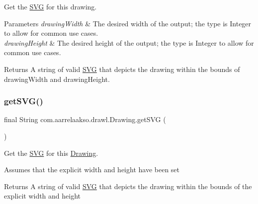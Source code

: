 Get the \hyperlink{classcom_1_1aarrelaakso_1_1drawl_1_1_s_v_g}{S\+VG} for this drawing. 


\begin{DoxyParams}{Parameters}
{\em drawing\+Width} & The desired width of the output; the type is Integer to allow for common use cases. \\
\hline
{\em drawing\+Height} & The desired height of the output; the type is Integer to allow for common use cases. \\
\hline
\end{DoxyParams}
\begin{DoxyReturn}{Returns}
A string of valid \hyperlink{classcom_1_1aarrelaakso_1_1drawl_1_1_s_v_g}{S\+VG} that depicts the drawing within the bounds of drawing\+Width and drawing\+Height. 
\end{DoxyReturn}
\mbox{\label{classcom_1_1aarrelaakso_1_1drawl_1_1_drawing_ada7c8b8df06ba84c1334e98751730500}} 
\subsubsection{\texorpdfstring{get\+S\+V\+G()}{getSVG()}\hspace{0.1cm}{\footnotesize\ttfamily [2/2]}}
{\footnotesize\ttfamily final String com.\+aarrelaakso.\+drawl.\+Drawing.\+get\+S\+VG (\begin{DoxyParamCaption}{ }\end{DoxyParamCaption})}



Get the \hyperlink{classcom_1_1aarrelaakso_1_1drawl_1_1_s_v_g}{S\+VG} for this \hyperlink{classcom_1_1aarrelaakso_1_1drawl_1_1_drawing}{Drawing}. 

Assumes that the explicit width and height have been set

\begin{DoxyReturn}{Returns}
A string of valid \hyperlink{classcom_1_1aarrelaakso_1_1drawl_1_1_s_v_g}{S\+VG} that depicts the drawing within the bounds of the explicit width and height 
\end{DoxyReturn}
\mbox{\label{classcom_1_1aarrelaakso_1_1drawl_1_1_drawing_ab5e45e49b01dc01733156f2bd3e917ea}} 
